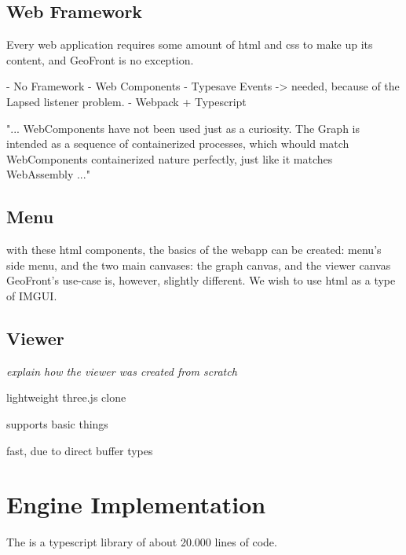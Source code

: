 \subsection{Web Framework}
Every web application requires some amount of html and css to make up its content, and GeoFront is no exception. 


- No Framework
- Web Components
- Typesave Events -> needed, because of the Lapsed listener problem.
- Webpack + Typescript

"...
WebComponents have not been used just as a curiosity. 
The Graph is intended as a sequence of containerized processes, 
which whould match WebComponents containerized nature perfectly, just like it matches WebAssembly
..."



\subsection{Menu}
with these html components, the basics of the webapp can be created: menu's side menu, and the two main canvases: the graph canvas, and the viewer canvas 
GeoFront's use-case is, however, slightly different. We wish to use html as a type of IMGUI. 




\subsection{Viewer}
\emph{explain how the viewer was created from scratch}

lightweight three.js clone

supports basic things

fast, due to direct buffer types








\section{Engine Implementation}
The  is a typescript library of about 20.000 lines of code. 

